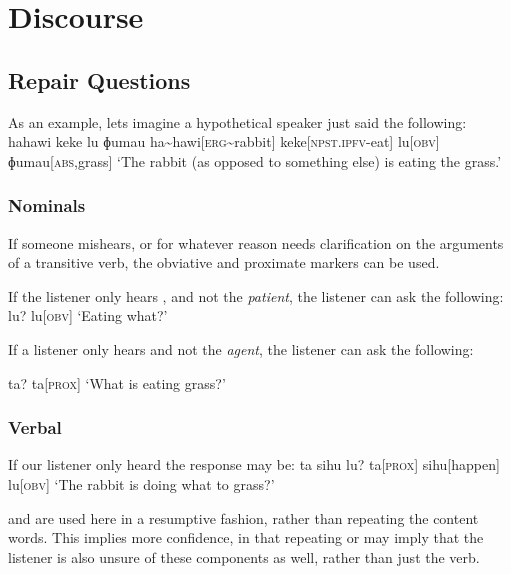 
\chapter{Discourse}

\section{Repair Questions}
As an example, lets imagine a hypothetical speaker just said the following:
\ex
\begingl
\glpreamble hahawi keke lu ɸumau
\endpreamble
ha\textasciitilde hawi[\textsc{erg\textasciitilde}rabbit]
keke[\textsc{npst.ipfv-}eat]
lu[\textsc{obv}]
ɸumau[\textsc{abs,}grass]
\glft `The rabbit (as opposed to something else) is eating the grass.'
\endgl
\xe

\subsection{Nominals}

If someone mishears, or for whatever reason needs clarification on the arguments of a transitive verb, the obviative and proximate markers can be used.

\begin{paracol}{2}
If the listener only hears , and not the \textit{patient}, the listener can ask the following:
\ex
\begingl
\glpreamble lu?
\endpreamble
lu[\textsc{obv}]
\glft `Eating what?'
\endgl
\xe
\switchcolumn

If a listener only hears  and not the \textit{agent}, the listener can ask the following:

\ex
\begingl
\glpreamble ta?
\endpreamble
ta[\textsc{prox}]
\glft `What is eating grass?'
\endgl
\xe
\end{paracol}

\subsection{Verbal}
If our listener only heard  the response may be:
\ex
\begingl
\glpreamble ta sihu lu?
\endpreamble
ta[\textsc{prox}]
sihu[happen]
lu[\textsc{obv}]
\glft `The rabbit is doing what to grass?'
\endgl
\xe

 and  are used here in a resumptive fashion, rather than repeating the content words. This implies more confidence, in that repeating  or  may imply that the listener is also unsure of these components as well, rather than just the verb.

